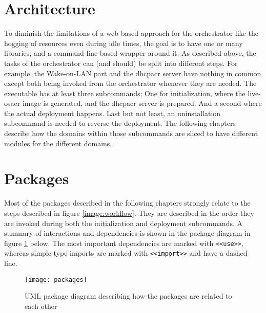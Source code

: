 \section{Architecture}
To diminish the limitations of a web-based approach for the orchestrator like the hogging of resources even during idle times, the goal is to have one or many libraries, and a command-line-based wrapper around it.
\newline
As described above, the tasks of the orchestrator can (and should) be split into different steps. For example, the Wake-on-LAN part and the \gls{dhcpacr} server have nothing in common except both being invoked from the orchestrator whenever they are needed.
\newline
The executable has at least three subcommands; One for initialization, where the live-\gls{osacr} image is generated, and the \gls{dhcpacr} server is prepared. And a second where the actual deployment happens. Last but not least, an uninstallation subcommand is needed to reverse the deployment.
\newline
The following chapters describe how the domains within those subcommands are sliced to have different modules for the different domains.

\section{Packages}
Most of the packages described in the following chapters strongly relate to the steps described in figure \ref{image:workflow}. They are described in the order they are invoked during both the initialization and deployment subcommands. A summary of interactions and dependencies is shown in the package diagram in figure \ref{image:packages} below. The most important dependencies are marked with \texttt{<<use>>}, whereas simple type imports are marked with \texttt{<<import>>} and have a dashed line.

\begin{figure}[H]
  \texttt{[image: packages]}
  \centering
  \caption{UML package diagram describing how the packages are related to each other}
  \label{image:packages}
\end{figure}

